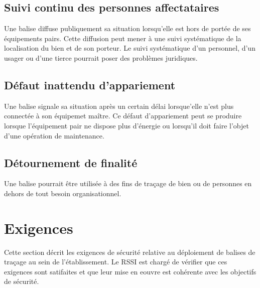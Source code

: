 \documentclass[headings=small,cmyk,french,a4paper,twocolumn,garamond,11pt]{scrartcl}
\begin{document}
\subsection{Suivi continu des personnes affectataires}
Une balise diffuse publiquement sa situation lorsqu'elle est hors de
portée de ses équipements pairs. Cette diffusion peut mener à une
suivi systématique de la localisation du bien et de son
porteur. Le suivi systématique d'un personnel, d'un usager ou d'une
tierce pourrait poser des problèmes juridiques.

\subsection{Défaut inattendu d'appariement }
Une balise signale sa situation après un certain délai lorsque'elle
n'est plus connectée à son équipemet maître. Ce défaut d'appariement
peut se produire lorsque l'équipement pair ne dispose plus d'énergie ou
lorsqu'il doit faire l'objet d'une opération de maintenance.

\subsection{Détournement de finalité}
Une balise pourrait être utilisée à des fins de traçage de bien ou de
personnes en dehors de tout besoin organisationnel.

\section{Exigences}
Cette section décrit les exigences de sécurité relative au déploiement
de balises de traçage au sein de l'établissement. Le RSSI est chargé
de vérifier que ces exigences sont satifaites et que leur mise en
eouvre est cohérente avec les objectifs de sécurité.
\end{document}
